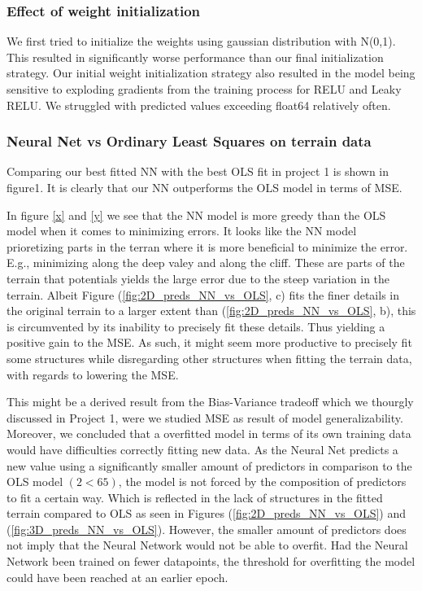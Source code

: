 \documentclass
[twocolumn,
secnumarabic,
nobibnotes,
aps,
prl,
reprint,
groupedaddress,
amsmath,
amssymb
]{revtex4-2}
\begin{document}
\subsubsection{Effect of weight initialization}
We first tried to initialize the weights using gaussian distribution with N(0,1). This resulted in significantly worse performance than our final initialization strategy. Our initial weight initialization strategy also resulted in the model being sensitive to exploding gradients from the training process for RELU and Leaky RELU. We struggled with predicted values exceeding float64 relatively often.


\subsubsection{Neural Net vs Ordinary Least Squares on terrain data}
Comparing our best fitted NN with the best OLS fit in project 1 is shown in figure1. It is clearly that our NN outperforms the OLS model in terms of MSE.

In figure \ref{x} and \ref{y} we see that the NN model is more greedy than the OLS model when it comes to minimizing errors. It looks like the NN model prioretizing parts in the terran
where it is more beneficial to minimize the error. E.g., minimizing along the deep valey and along the cliff. These are parts of the terrain that potentials yields the large error due to the steep
variation in the terrain. Albeit Figure (\ref{fig:2D_preds_NN_vs_OLS}, c) fits the finer details in the original terrain to a larger extent than (\ref{fig:2D_preds_NN_vs_OLS}, b), this is circumvented by its inability to precisely fit these details. Thus yielding a positive gain to the MSE. As such, it might seem more productive to precisely fit some structures while disregarding other structures when fitting the terrain data, with regards to lowering the MSE.

This might be a derived result from the Bias-Variance tradeoff which we thourgly discussed in Project 1, were we studied MSE as result of model generalizability. Moreover, we concluded that a overfitted model in terms of its own training data would have difficulties correctly fitting new data. As the Neural Net predicts a new value using a significantly smaller amount of predictors in comparison to the OLS model $(2 < 65)$, the model is not forced by the composition of predictors to fit a certain way. Which is reflected in the lack of structures in the fitted terrain compared to OLS as seen in Figures (\ref{fig:2D_preds_NN_vs_OLS}) and (\ref{fig:3D_preds_NN_vs_OLS}). However, the smaller amount of predictors does not imply that the Neural Network would not be able to overfit. Had the Neural Network been trained on fewer datapoints, the threshold for overfitting the model could have been reached at an earlier epoch.
\end{document}
